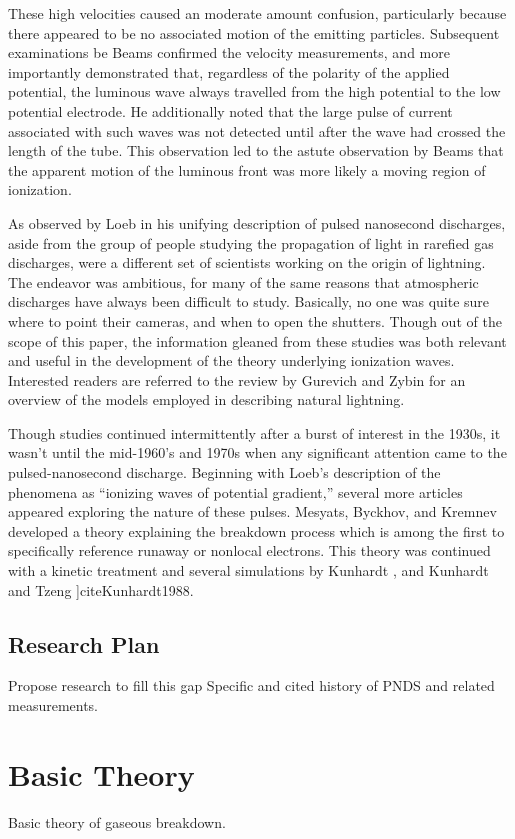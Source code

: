 These high velocities caused an moderate amount confusion, particularly because
there appeared to be no associated motion of the emitting particles. Subsequent
examinations be Beams \cite{Beams1930} confirmed the velocity measurements, and
more importantly demonstrated that, regardless of the polarity of the applied
potential, the luminous wave always travelled from the high potential to the low
potential electrode. He additionally noted that the large pulse of current
associated with such waves was not detected until after the wave had crossed the
length of the tube. This observation led to the astute observation by Beams that
the apparent motion of the luminous front was more likely a moving region of
ionization.

As observed by Loeb \cite{Loeb1965} in his unifying description of pulsed
nanosecond discharges, aside from the group of people studying the propagation
of light in rarefied gas discharges, were a different set of scientists working
on the origin of lightning. The endeavor was ambitious, for many of the same
reasons that atmospheric discharges have always been difficult to study.
Basically, no one was quite sure where to point their cameras, and when to open
the shutters. Though out of the scope of this paper, the information gleaned
from these studies was both relevant and useful in the development of the theory
underlying ionization waves. Interested readers are referred to the review by
Gurevich and Zybin \cite{Gurevich2001} for an overview of the models employed in
describing natural lightning.

Though studies continued intermittently after a burst of interest in the 1930s,
it wasn't until the mid-1960's and 1970s when any significant attention came to
the pulsed-nanosecond discharge. Beginning with Loeb's description of the
phenomena as ``ionizing waves of potential gradient,'' several more articles
appeared exploring the nature of these pulses. Mesyats, Byckhov, and Kremnev
\cite{Mesyats1972} developed a theory explaining the breakdown process which is
among the first to specifically reference runaway or nonlocal electrons. This
theory was continued with a kinetic treatment and several simulations by
Kunhardt \cite{Kunhardt1980}, and Kunhardt and Tzeng ]cite{Kunhardt1988}.



\subsection{Research Plan}

Propose research to fill this gap
Specific and cited history of PNDS and related measurements.

\section{Basic Theory}

Basic theory of gaseous breakdown.
